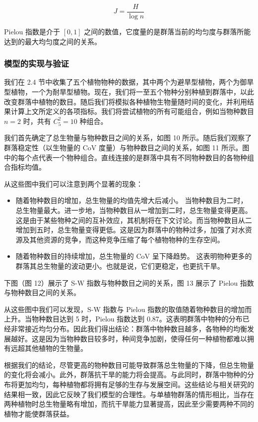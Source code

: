\documentclass[11pt,a4paper]{ctexart}
\begin{document}
\begin{equation}
J=\frac{H}{\log n}
\label{eq:pielou}
\end{equation}

Pielou 指数是介于 $[0,1]$ 之间的数值，它度量的是群落当前的均匀度与群落所能达到的最大均匀度之间的关系。

\subsubsection{模型的实现与验证}

我们在 2.4 节中收集了五个植物物种的数据，其中两个为避旱型植物，两个为御旱型植物，一个为耐旱型植物。现在，我们将一至五个物种分别种植到群落中，以此改变群落中植物的数目。随后我们将模拟各种植物生物量随时间的变化，并利用结果计算上文所定义的各项指标。我们将尝试植物的所有可能组合，例如当物种数目 $n=2$ 时，共有 $C_5^2=10$ 种组合。

我们首先确定了总生物量与物种数目之间的关系，如图 10 所示。随后我们观察了群落稳定性（以生物量的 CoV 度量）与物种数目之间的关系，如图 11 所示。图中的每个点代表一个物种组合。直线连接的是群落中具有不同物种数目的各物种组合指标均值。

从这些图中我们可以注意到两个显著的现象：

\begin{itemize}
\item 随着物种数目的增加，总生物量的均值先增大后减小。
当物种数目为二时，总生物量最大。进一步地，当物种数目从一增加到二时，总生物量变得更高。这是由于某些物种之间的互补效应，其机制将在下文讨论。而当物种数目从二增加到五时，总生物量变得更低。这是因为群落中的物种过多，加强了对水资源及其他资源的竞争，而这种竞争压缩了每个植物物种的生存空间。
\item 随着物种数目的持续增加，总生物量的 CoV 呈下降趋势。
这表明物种更多的群落其总生物量的波动更小。也就是说，它们更稳定，也更抗干旱。
\end{itemize}

下图（图 12）展示了 S-W 指数与物种数目之间的关系，图 13 展示了 Pielou 指数与物种数目之间的关系。

从这些图中我们可以发现，S-W 指数与 Pielou 指数的取值随着物种数目的增加而上升。当物种数目达到 5 时，Pielou 指数达到 0.87。这表明群落中物种的分布已经非常接近均匀分布。因此我们得出结论：群落中物种数目越多，各物种的均衡发展越好。这是因为当物种数目较多时，种间竞争加剧，使得任何一种植物都难以拥有远超其他植物的生物量。

根据我们的结论，尽管更高的物种数目可能导致群落总生物量的下降，但总生物量的变化将会减小。此外，群落抗干旱的能力将会提高。与此同时，群落中物种的分布将更加均匀，每种植物都将拥有足够的生存与发展空间。这些结论与相关研究的结果相一致，因此它反映了我们模型的合理性。与单植物群落的情形相比，当存在两种植物时总生物量略有增加，而抗干旱能力显著提高，因此至少需要两种不同的植物才能使群落获益。
\end{document}
